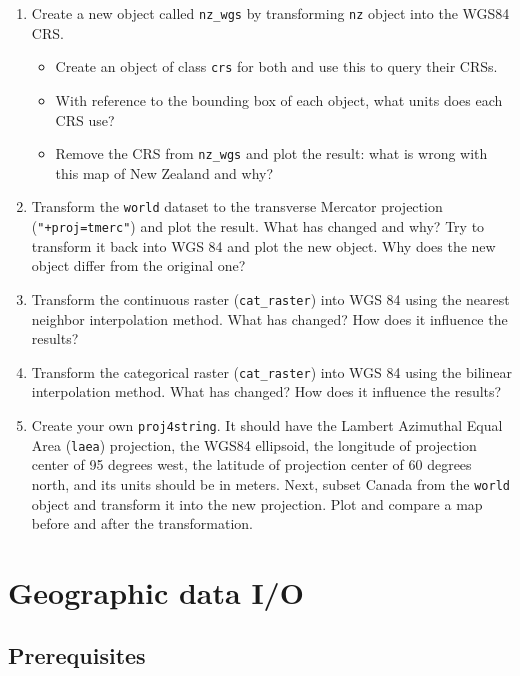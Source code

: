 \documentclass[]{krantz}
\providecommand{\tightlist}{%
  \setlength{\itemsep}{0pt}\setlength{\parskip}{0pt}}
\begin{document}
\begin{enumerate}
\def\labelenumi{\arabic{enumi}.}
\item
  Create a new object called \texttt{nz\_wgs} by transforming \texttt{nz} object into the WGS84 CRS.

  \begin{itemize}
  \tightlist
  \item
    Create an object of class \texttt{crs} for both and use this to query their CRSs.
  \item
    With reference to the bounding box of each object, what units does each CRS use?
  \item
    Remove the CRS from \texttt{nz\_wgs} and plot the result: what is wrong with this map of New Zealand and why?
  \end{itemize}
\item
  Transform the \texttt{world} dataset to the transverse Mercator projection (\texttt{"+proj=tmerc"}) and plot the result.
  What has changed and why?
  Try to transform it back into WGS 84 and plot the new object.
  Why does the new object differ from the original one?
\item
  Transform the continuous raster (\texttt{cat\_raster}) into WGS 84 using the nearest neighbor interpolation method.
  What has changed?
  How does it influence the results?
\item
  Transform the categorical raster (\texttt{cat\_raster}) into WGS 84 using the bilinear interpolation method.
  What has changed?
  How does it influence the results?
\item
  Create your own \texttt{proj4string}.
  It should have the Lambert Azimuthal Equal Area (\texttt{laea}) projection, the WGS84 ellipsoid, the longitude of projection center of 95 degrees west, the latitude of projection center of 60 degrees north, and its units should be in meters.
  Next, subset Canada from the \texttt{world} object and transform it into the new projection.
  Plot and compare a map before and after the transformation.
\end{enumerate}

\hypertarget{read-write}{%
\section{Geographic data I/O}\label{read-write}}

\hypertarget{prerequisites-5}{%
\subsection*{Prerequisites}\label{prerequisites-5}}
\end{document}
